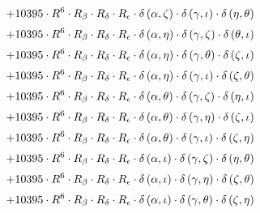 \begin{subequations}
\begin{gather}
 \\[0.2em] \notag 		 + 10395 \cdot R^{6} \cdot R_{\beta{}} \cdot R_{\delta{}} \cdot R_{\epsilon{}} \cdot \delta{}\left(\alpha{}, \zeta{}\right) \cdot \delta{}\left(\gamma{}, \iota{}\right) \cdot \delta{}\left(\eta{}, \theta{}\right) 
 \\[0.2em] \notag 		 + 10395 \cdot R^{6} \cdot R_{\beta{}} \cdot R_{\delta{}} \cdot R_{\epsilon{}} \cdot \delta{}\left(\alpha{}, \eta{}\right) \cdot \delta{}\left(\gamma{}, \zeta{}\right) \cdot \delta{}\left(\theta{}, \iota{}\right) 
 \\[0.2em] \notag 		 + 10395 \cdot R^{6} \cdot R_{\beta{}} \cdot R_{\delta{}} \cdot R_{\epsilon{}} \cdot \delta{}\left(\alpha{}, \eta{}\right) \cdot \delta{}\left(\gamma{}, \theta{}\right) \cdot \delta{}\left(\zeta{}, \iota{}\right) 
 \\[0.2em] \notag 		 + 10395 \cdot R^{6} \cdot R_{\beta{}} \cdot R_{\delta{}} \cdot R_{\epsilon{}} \cdot \delta{}\left(\alpha{}, \eta{}\right) \cdot \delta{}\left(\gamma{}, \iota{}\right) \cdot \delta{}\left(\zeta{}, \theta{}\right) 
 \\[0.2em] \notag 		 + 10395 \cdot R^{6} \cdot R_{\beta{}} \cdot R_{\delta{}} \cdot R_{\epsilon{}} \cdot \delta{}\left(\alpha{}, \theta{}\right) \cdot \delta{}\left(\gamma{}, \zeta{}\right) \cdot \delta{}\left(\eta{}, \iota{}\right) 
 \\[0.2em] \notag 		 + 10395 \cdot R^{6} \cdot R_{\beta{}} \cdot R_{\delta{}} \cdot R_{\epsilon{}} \cdot \delta{}\left(\alpha{}, \theta{}\right) \cdot \delta{}\left(\gamma{}, \eta{}\right) \cdot \delta{}\left(\zeta{}, \iota{}\right) 
 \\[0.2em] \notag 		 + 10395 \cdot R^{6} \cdot R_{\beta{}} \cdot R_{\delta{}} \cdot R_{\epsilon{}} \cdot \delta{}\left(\alpha{}, \theta{}\right) \cdot \delta{}\left(\gamma{}, \iota{}\right) \cdot \delta{}\left(\zeta{}, \eta{}\right) 
 \\[0.2em] \notag 		 + 10395 \cdot R^{6} \cdot R_{\beta{}} \cdot R_{\delta{}} \cdot R_{\epsilon{}} \cdot \delta{}\left(\alpha{}, \iota{}\right) \cdot \delta{}\left(\gamma{}, \zeta{}\right) \cdot \delta{}\left(\eta{}, \theta{}\right) 
 \\[0.2em] \notag 		 + 10395 \cdot R^{6} \cdot R_{\beta{}} \cdot R_{\delta{}} \cdot R_{\epsilon{}} \cdot \delta{}\left(\alpha{}, \iota{}\right) \cdot \delta{}\left(\gamma{}, \eta{}\right) \cdot \delta{}\left(\zeta{}, \theta{}\right) 
 \\[0.2em] \notag 		 + 10395 \cdot R^{6} \cdot R_{\beta{}} \cdot R_{\delta{}} \cdot R_{\epsilon{}} \cdot \delta{}\left(\alpha{}, \iota{}\right) \cdot \delta{}\left(\gamma{}, \theta{}\right) \cdot \delta{}\left(\zeta{}, \eta{}\right) 

\end{gather}
\end{subequations}

